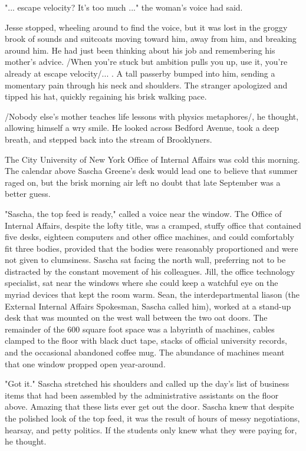 
"... escape velocity?  It's too much ..." the woman's voice had said.

Jesse stopped, wheeling around to find the voice, but it was lost in the groggy brook of sounds and suitcoats moving toward him, away from him, and breaking around him.  He had just been thinking about his job and remembering his mother's advice.  /When you're stuck but ambition pulls you up, use it, you're already at escape velocity/... .  A tall passerby bumped into him, sending a momentary pain through his neck and shoulders.  The stranger apologized and tipped his hat, quickly regaining his brisk walking pace.

/Nobody else's mother teaches life lessons with physics metaphores/, he thought, allowing himself a wry smile.  He looked across Bedford Avenue, took a deep breath, and stepped back into the stream of Brooklyners.


The City University of New York Office of Internal Affairs was cold this morning.  The calendar above Sascha Greene's desk would lead one to believe that summer raged on, but the brisk morning air left no doubt that late September was a better guess.

"Sascha, the top feed is ready," called a voice near the window.  The Office of Internal Affairs, despite the lofty title, was a cramped, stuffy office that contained five desks, eighteen computers and other office machines, and could comfortably fit three bodies, provided that the bodies were reasonably proportioned and were not given to clumsiness.  Sascha sat facing the north wall, preferring not to be distracted by the constant movement of his colleagues.  Jill, the office technology specialist, sat near the windows where she could keep a watchful eye on the myriad devices that kept the room warm.  Sean, the interdepartmental liason (the External Internal Affairs Spokesman, Sascha called him), worked at a stand-up desk that was mounted on the west wall between the two oat doors.  The remainder of the 600 square foot space was a labyrinth of machines, cables clamped to the floor with black duct tape, stacks of official university records, and the occasional abandoned coffee mug.  The abundance of machines meant that one window propped open year-around.

"Got it."  Sascha stretched his shoulders and called up the day's list of business items that had been assembled by the administrative assistants on the floor above.  Amazing that these lists ever get out the door.  Sascha knew that despite the polished look of the top feed, it was the result of hours of messy negotiations, hearsay, and petty politics.  If the students only knew what they were paying for, he thought.

